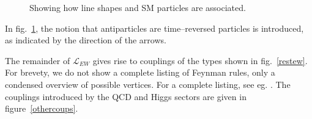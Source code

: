 \begin{figure}[hbtp]
\begin{minipage}[b]{.69\textwidth}
\centering\footnotesize
{}
\hspace{5em}
\vspace{1em}

\hspace{5em}
\end{minipage}
\hfill
\begin{minipage}[b]{.3\textwidth}
\caption{Showing how line shapes and SM particles are associated.}\label{ewprops}
\end{minipage}
\end{figure}

In fig.~\ref{ewprops}, the notion that antiparticles are time--reversed particles is introduced, as indicated by the direction of the arrows.

The remainder of $\mathcal{L}_\textit{EW}$ gives rise to couplings of the types shown in fig.~\ref{restew}. For brevety, we do not show a complete listing of Feynman rules, only a condensed overview of possible vertices. For a complete listing, see eg. \cite{allfeynrules}. The couplings introduced by the QCD and Higgs sectors are given in figure~\ref{othercoups}.

